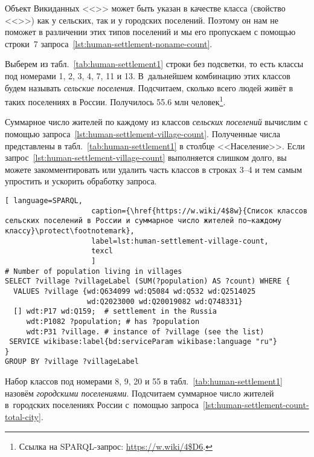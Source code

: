 Объект Викиданных <<>> 
может быть указан в качестве класса (свойство <<>>) 
как у сельских, так и у городских поселений. 
Поэтому он нам не поможет в различении этих типов поселений 
и мы его пропускаем с помощью строки~7 запроса~\ref{lst:human-settlement-noname-count}.



\newpage
Выберем из табл.~\ref{tab:human-settlement1} строки без подсветки, 
то есть классы под номерами 1, 2, 3, 4, 7, 11 и 13. 
В~дальнейшем комбинацию этих классов будем называть \emph{сельские поселения}. 
Подсчитаем, сколько всего людей живёт в таких поселениях в России. 
Получилось \num{55,6} млн человек\footnote{%
Ссылка на SPARQL-запрос: \url{https://w.wiki/4$D6}.%
}. 

Суммарное число жителей по каждому из классов \emph{сельских поселений} 
вычислим с помощью запроса~\ref{lst:human-settlement-village-count}. 
Полученные числа представлены в табл.~\ref{tab:human-settlement1} в столбце <<Население>>. 
Если запрос~\ref{lst:human-settlement-village-count} выполняется слишком долго, 
вы можете закомментировать или удалить часть классов в строках 3--4 
и тем самым упростить и ускорить обработку запроса. 

\begin{lstlisting}[ language=SPARQL, 
                    caption={\href{https://w.wiki/4$8w}{Список классов сельских поселений в России и суммарное число жителей по~каждому классу}\protect\footnotemark},
                    label=lst:human-settlement-village-count,
                    texcl 
                    ]
# Number of population living in villages
SELECT ?village ?villageLabel (SUM(?population) AS ?count) WHERE {  
  VALUES ?village {wd:Q634099 wd:Q5084 wd:Q532 wd:Q2514025 
                   wd:Q2023000 wd:Q20019082 wd:Q748331}
  [] wdt:P17 wd:Q159;  # settlement in the Russia
     wdt:P1082 ?population; # has ?population
     wdt:P31 ?village. # instance of ?village (see the list)
 SERVICE wikibase:label{bd:serviceParam wikibase:language "ru"}
}
GROUP BY ?village ?villageLabel
\end{lstlisting}%



Набор классов под номерами 8, 9, 20 и 55 в табл.~\ref{tab:human-settlement1} 
назовём \emph{городскими поселениями}. 
Подсчитаем суммарное число жителей в~городских поселениях России 
с~помощью запроса~\ref{lst:human-settlement-count-total-city}. 


